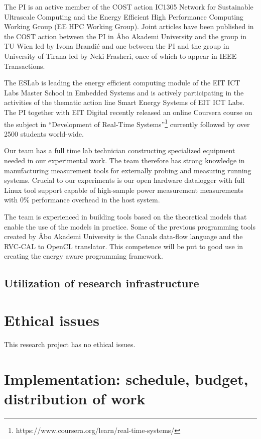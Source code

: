 \documentclass{article}
\begin{document}
The PI is an active member of the COST action IC1305 Network for Sustainable Ultrascale Computing and the Energy Efficient High Performance Computing Working Group (EE HPC Working Group). 
Joint articles have been published in the COST action between the PI in \AA{}bo Akademi University and the group in TU Wien led by Ivona Brandi\'{c} and one between the PI and the group in University of Tirana led by Neki Frasheri, once of which to appear in IEEE Transactions.

The ESLab is leading the energy efficient computing module of the EIT ICT Labs Master School in Embedded Systems and is actively participating in the activities of the thematic action line Smart Energy Systems of EIT ICT Labs.
The PI together with EIT Digital recently released an online Coursera course on the subject in ``Development of Real-Time Systems''\footnote{https://www.coursera.org/learn/real-time-systems/} currently followed by over 2500 students world-wide.

Our team has a full time lab technician constructing specialized equipment needed in our experimental work. 
The team therefore has strong knowledge in manufacturing measurement tools for externally probing and measuring running systems. 
Crucial to our experiments is our open hardware datalogger with full Linux tool support capable of high-sample power measurement measurements with 0\% performance overhead in the host system. 

The team is experienced in building tools based on the theoretical models that enable the use of the models in practice. 
Some of the previous programming tools created by \AA{}bo Akademi University is the Canals data-flow language and the RVC-CAL to OpenCL translator. 
This competence will be put to good use in creating the energy aware programming framework.

\subsection{Utilization of research infrastructure}

\section{Ethical issues}
This research project has no ethical issues.

\section{Implementation: schedule, budget, distribution of work}
\end{document}
